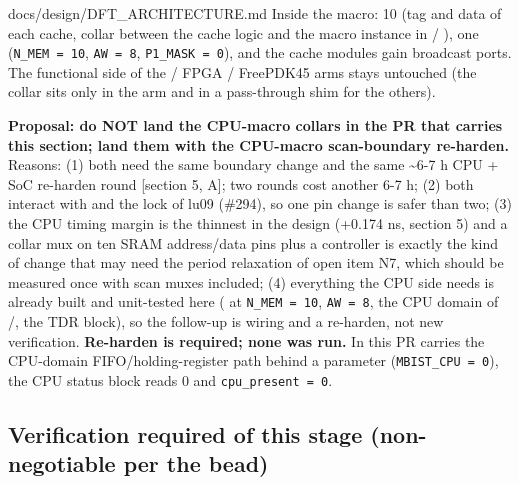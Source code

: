 \begin{relocated}{docs/design/DFT_ARCHITECTURE.md}
Inside the macro: 10  (tag and data of each cache,
collar between the cache logic and the macro instance in
 / ), one 
(\texttt{N\_\allowbreak{}MEM\ =\allowbreak{}\ 10},
\texttt{AW\ =\allowbreak{}\ 8},
\texttt{P1\_\allowbreak{}MASK\ =\allowbreak{}\ 0}), and the cache
modules gain  broadcast ports. The functional side of the
 / FPGA / FreePDK45 arms stays untouched (the collar
sits only in the  arm and in a pass-through shim for
the others).

\textbf{Proposal: do NOT land the CPU-macro collars in the PR that
carries this section; land them with the  CPU-macro
scan-boundary re-harden.} Reasons: (1) both need the same boundary
change and the same \textasciitilde6-7 h CPU + SoC re-harden round
{[}section 5, A{]}; two rounds cost another 6-7 h; (2) both interact
with  and the lock of lu09 (\#294), so one pin
change is safer than two; (3) the CPU timing margin is the thinnest in
the design (+0.174 ns, section 5) and a collar mux on ten SRAM
address/\allowbreak{}data pins plus a controller is exactly the kind of
change that may need the period relaxation of open item N7, which should
be measured once with scan muxes included; (4) everything the CPU side
needs is already built and unit-tested here ( at
\texttt{N\_\allowbreak{}MEM\ =\allowbreak{}\ 10},
\texttt{AW\ =\allowbreak{}\ 8}, the CPU domain of
/, the TDR block), so the follow-up is
wiring and a re-harden, not new verification. \textbf{Re-harden is
required; none was run.} In this PR  carries the
CPU-domain FIFO/\allowbreak{}holding-register path behind a parameter
(\texttt{MBIST\_\allowbreak{}CPU\ =\allowbreak{}\ 0}), the CPU status
block reads 0 and \texttt{cpu\_\allowbreak{}present\ =\allowbreak{}\ 0}.

\subsection{Verification required of this stage (non-negotiable per
the bead)}\label{tm:ch:dft-architecture:168-verification-required-of-this-stage-non-negotiable-per-the-bead}


\end{relocated}
